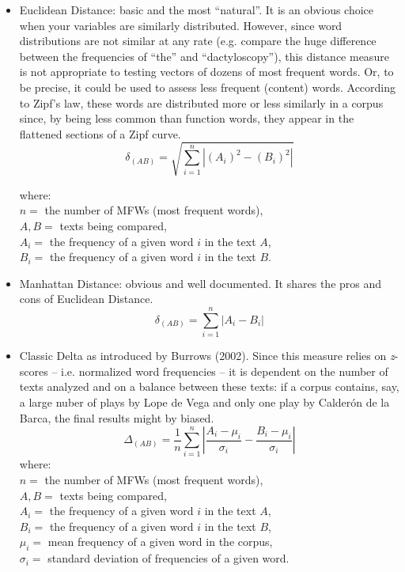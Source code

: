 \documentclass[11pt,a4paper]{article}
\def\margin#1{\marginpar{\textcolor{blue}{\footnotesize\tt #1}}}
\begin{document}
\begin{itemize}
\item Euclidean Distance: basic and the most ``natural''.\margin{"EU"}
It is an obvious choice when your variables are similarly distributed.
However, since word distributions are not similar at any rate (e.g.
compare the huge difference between the frequencies of ``the'' and ``dactyloscopy''),
this distance measure is not appropriate to testing vectors of dozens
of most frequent words. Or, to be precise, it could be used to assess
less frequent (content) words. According to Zipf's law, these words
are distributed more or less similarly in a corpus since, by being
less common than function words, they appear in the flattened sections
of a Zipf curve. 
\[
\delta_{(AB)}=\sqrt{\sum_{i=1}^{n}\left\vert (A_{i})^{2}-(B_{i})^{2}\right\vert }
\]



where: \\
 $n=$ the number of MFWs (most frequent words), \\
 $A,B=$ texts being compared, \\
 $A_{i}=$ the frequency of a given word $i$ in the text $A$, \\
 $B_{i}=$ the frequency of a given word $i$ in the text $B$. \\


\item \noindent Manhattan Distance: obvious and well documented.\margin{"MH"}
It shares the pros and cons of Euclidean Distance. 
\[
\delta_{(AB)}=\sum_{i=1}^{n}\left\vert A_{i}-B_{i}\right\vert 
\]

\item Classic Delta as introduced by Burrows (2002).\margin{"CD"}
Since this measure relies on \textit{z}-scores -- i.e. normalized word frequencies
-- it is dependent on the number of texts analyzed and on a balance
between these texts: if a corpus contains, say, a large nuber of plays
by Lope de Vega and only one play by Calderón de la Barca, the final
results might by biased. 
\[
\Delta_{(AB)}=\frac{1}{n}\sum_{i=1}^{n}\left\vert \frac{A_{i}-\mu_{i}}{\sigma_{i}}-\frac{B_{i}-\mu_{i}}{\sigma_{i}}\right\vert 
\]
where: \\
 $n=$ the number of MFWs (most frequent words), \\
 $A,B=$ texts being compared, \\
 $A_{i}=$ the frequency of a given word $i$ in the text $A$, \\
 $B_{i}=$ the frequency of a given word $i$ in the text $B$, \\
 $\mu_{i}=$ mean frequency of a given word in the corpus, \\
 $\sigma_{i}=$ standard deviation of frequencies of a given word.



\end{itemize}
\end{document}
